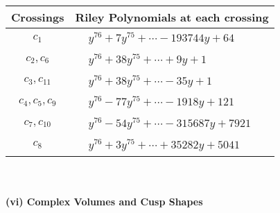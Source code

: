 \documentclass[1p]{elsarticle_modified}
\theoremstyle{definition}
\begin{document}
\begin{tabular}{m{50pt}|m{274pt}}
Crossings & \hspace{64pt}Riley Polynomials at each crossing \\
\hline $$\begin{aligned}c_{1}\end{aligned}$$&$\begin{aligned}
&y^{76}+7 y^{75}+\cdots-193744 y+64
\end{aligned}$\\
\hline $$\begin{aligned}c_{2},c_{6}\end{aligned}$$&$\begin{aligned}
&y^{76}+38 y^{75}+\cdots+9 y+1
\end{aligned}$\\
\hline $$\begin{aligned}c_{3},c_{11}\end{aligned}$$&$\begin{aligned}
&y^{76}+38 y^{75}+\cdots-35 y+1
\end{aligned}$\\
\hline $$\begin{aligned}c_{4},c_{5},c_{9}\end{aligned}$$&$\begin{aligned}
&y^{76}-77 y^{75}+\cdots-1918 y+121
\end{aligned}$\\
\hline $$\begin{aligned}c_{7},c_{10}\end{aligned}$$&$\begin{aligned}
&y^{76}-54 y^{75}+\cdots-315687 y+7921
\end{aligned}$\\
\hline $$\begin{aligned}c_{8}\end{aligned}$$&$\begin{aligned}
&y^{76}+3 y^{75}+\cdots+35282 y+5041
\end{aligned}$\\
\hline
\end{tabular}\\~\\
\newpage\flushleft \textbf{(vi) Complex Volumes and Cusp Shapes}
\end{document}
